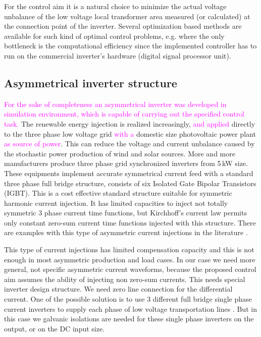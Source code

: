     For the control aim it is a natural choice to minimize the actual voltage unbalance of the low voltage local transformer area measured (or calculated) at the connection point of the inverter. Several optimization based methods are available for such kind of optimal control problems, e.g.  \cite{gorbe2012reduction} where the only bottleneck is the computational efficiency since the implemented controller has to run on the commercial inverter's hardware (digital signal processor unit).

    \subsection{Asymmetrical inverter structure}

    \textcolor{magenta}{For the sake of completeness an asymmetrical inverter was developed in simulation environment, which is capable of carrying out the specified control task.} The renewable energy injection is realized increasingly, \textcolor{magenta}{and applied} directly to the three phase low voltage grid  \textcolor{magenta}{with a} domestic size photovoltaic power plant \textcolor{magenta}{as source of power}. This can reduce the voltage and current unbalance caused by the stochastic power production of wind and solar sources. More and more manufacturers produce three phase grid synchronized inverters from 5\,kW size. These equipments implement accurate symmetrical current feed with a standard three phase full bridge structure, consists of six Isolated Gate Bipolar Transistors (IGBT). This is a cost effective standard structure suitable for symmetric harmonic current injection. It has limited capacities to inject not totally symmetric 3 phase current time functions, but Kirchhoff's current law permits only constant zero-sum current time functions injected with this structure. There are examples with this type of asymmetric current injections in the literature \cite{lee2009new}.

    This type of current injections has limited compensation capacity and this is not enough in most asymmetric production and load cases. In our case we need more general, not specific asymmetric current waveforms, because the proposed control aim assumes the ability of injecting non zero-sum currents. This needs special inverter design structure. We need zero line connection for the differential current. One of the possible solution is to use 3 different full bridge single phase current inverters to supply each phase of low voltage transportation lines \cite{Patnaik2013topologies}. But in this case we galvanic isolations are needed for these single phase inverters on the output, or on the DC input size.

